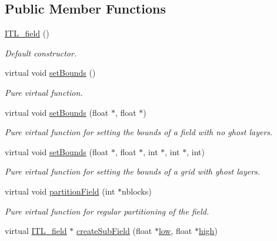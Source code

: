 \subsection*{Public Member Functions}
\begin{DoxyCompactItemize}
\item 
\hyperlink{classITL__field_acbb918b7ab99fe46d837465d16d4adab}{ITL\_\-field} ()
\begin{DoxyCompactList}\small\item\em Default constructor. \item\end{DoxyCompactList}\item 
virtual void \hyperlink{classITL__field_a134f7a48123be7d3fbfcb52b4bcbb5c8}{setBounds} ()
\begin{DoxyCompactList}\small\item\em Pure virtual function. \item\end{DoxyCompactList}\item 
virtual void \hyperlink{classITL__field_a7bf82ed82a338d34985a6758307c8ece}{setBounds} (float $\ast$, float $\ast$)
\begin{DoxyCompactList}\small\item\em Pure virtual function for setting the bounds of a field with no ghost layers. \item\end{DoxyCompactList}\item 
virtual void \hyperlink{classITL__field_ab27b49b81f3a7a2a614eaca91cd8eb8c}{setBounds} (float $\ast$, float $\ast$, int $\ast$, int $\ast$, int)
\begin{DoxyCompactList}\small\item\em Pure virtual function for setting the bounds of a grid with ghost layers. \item\end{DoxyCompactList}\item 
virtual void \hyperlink{classITL__field_a5c7ecb94890c0dd7d730e881f530bbc2}{partitionField} (int $\ast$nblocks)
\begin{DoxyCompactList}\small\item\em Pure virtual function for regular partitioning of the field. \item\end{DoxyCompactList}\item 
virtual \hyperlink{classITL__field}{ITL\_\-field} $\ast$ \hyperlink{classITL__field_a7ca32e8dd6186974778ae4c8302ee922}{createSubField} (float $\ast$\hyperlink{MainIT__regvector_8cpp_abb1e2dad97264e859f3ee8af1341d68c}{low}, float $\ast$\hyperlink{MainIT__regvector_8cpp_a2012a18ba7a98e566c072356d03c4240}{high})

\end{DoxyCompactItemize}
